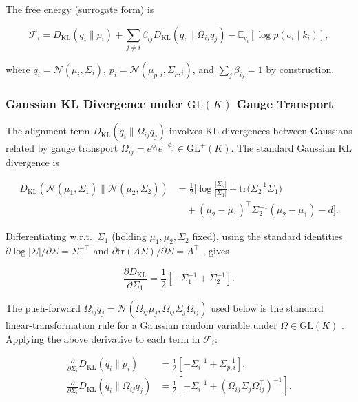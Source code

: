 \documentclass[twoside,11pt]{article}
\begin{document}
The free energy (surrogate form) is

\begin{equation}
\mathcal{F}_i
=D_{\mathrm{KL}}(q_i \| p_i)
+ \sum_{j \neq i} \beta_{ij} 
D_{\mathrm{KL}}(q_i \| \Omega_{ij} q_j)
- \mathbb{E}_{q_i}[\log p(o_i \mid k_i)],
\end{equation}

where $q_i = \mathcal{N}(\mu_i, \Sigma_i)$, $p_i = \mathcal{N}(\mu_{p,i}, \Sigma_{p,i})$, and $\sum_j \beta_{ij} = 1$ by construction.

\subsubsection{Gaussian KL Divergence under $\mathrm{GL}(K)$ Gauge Transport}

The alignment term $D_{\mathrm{KL}}(q_i \| \Omega_{ij} q_j)$ involves KL divergences between Gaussians related by gauge transport $\Omega_{ij} = e^{\phi_i}e^{-\phi_j} \in \mathrm{GL}^+(K)$. The standard Gaussian KL divergence \citep{bishop2006pattern,murphy2012machine,CoverThomas2006} is

\begin{align}
D_{\mathrm{KL}} \left(
\mathcal{N}(\mu_1, \Sigma_1)
 \|
\mathcal{N}(\mu_2, \Sigma_2)
\right)
&=
\frac{1}{2}
\Big[
\log \frac{|\Sigma_2|}{|\Sigma_1|}
+ \mathrm{tr} \big(\Sigma_2^{-1}\Sigma_1\big)
\\ &\quad
+ (\mu_2 - \mu_1)^\top
  \Sigma_2^{-1}
  (\mu_2 - \mu_1)
- d
\Big].
\label{eq:gaussian_KL}
\end{align}


Differentiating w.r.t.\ $\Sigma_1$ (holding $\mu_1,\mu_2,\Sigma_2$ fixed), using the standard identities $\partial \log|\Sigma|/\partial \Sigma = \Sigma^{-\top}$ and $\partial \mathrm{tr}(A\Sigma)/\partial \Sigma = A^\top$ \citep{petersen2012matrix}, gives

\begin{equation}
\frac{\partial D_{\mathrm{KL}}}{\partial \Sigma_1}
=\frac{1}{2}\left[
-\Sigma_1^{-1}
+ \Sigma_2^{-1}
\right].
\end{equation}

The push-forward $\Omega_{ij} q_j = \mathcal{N}(\Omega_{ij}\mu_j, \Omega_{ij}\Sigma_j\Omega_{ij}^\top)$ used below is the standard linear-transformation rule for a Gaussian random variable under $\Omega \in \mathrm{GL}(K)$ \citep[\S2.3.3]{bishop2006pattern}. Applying the above derivative to each term in $\mathcal{F}_i$:

\begin{align}
\frac{\partial}{\partial \Sigma_i}
D_{\mathrm{KL}}(q_i \| p_i)
&=\frac{1}{2}\left[
-\Sigma_i^{-1}
+ \Sigma_{p,i}^{-1}
\right],
\\[6pt]
\frac{\partial}{\partial \Sigma_i}
D_{\mathrm{KL}}(q_i \| \Omega_{ij} q_j)
&=
\frac{1}{2}\left[
-\Sigma_i^{-1}
+ (\Omega_{ij}\Sigma_j\Omega_{ij}^\top)^{-1}
\right].
\end{align}
\end{document}
